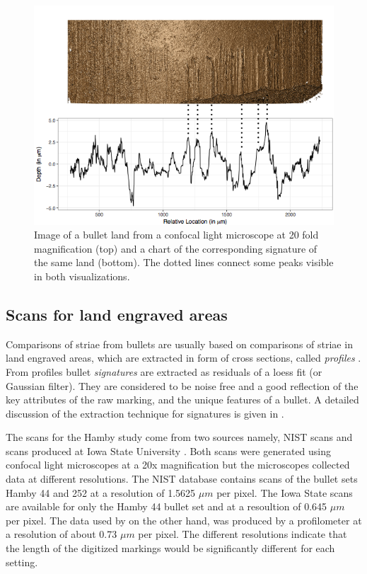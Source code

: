 \documentclass[12pt]{article}
\begin{document}
\begin{figure}
\centering
\includegraphics[width=\textwidth]{images/B6-B2-L6-rescaled.png}


\caption{\label{fig:rgl} Image of a bullet land from a confocal light microscope at 20 fold magnification (top) and a chart of the corresponding signature of the same land (bottom). The dotted lines connect some peaks visible in both visualizations.}

\end{figure}

\subsection{Scans for land engraved
areas}\label{scans-for-land-engraved-areas}

Comparisons of striae from bullets are usually based on comparisons of
striae in land engraved areas, which are extracted in form of cross
sections, called \emph{profiles} \citep{aoas,ma2004}. From profiles
bullet \emph{signatures} \citep{chu2013,aoas} are extracted as residuals
of a loess fit (or Gaussian filter). They are considered to be noise
free and a good reflection of the key attributes of the raw marking, and
the unique features of a bullet.
 A detailed
discussion of the extraction technique for signatures is given in
\citet{aoas}.

The scans for the Hamby study come from two sources namely, NIST scans
\citep{nist} and scans produced at Iowa State University
.
Both scans were generated using confocal light microscopes at a 20x
magnification but the microscopes collected data at different
resolutions. The NIST database contains scans of the bullet sets Hamby
44 and 252 at a resolution of 1.5625 \(\mu m\) per pixel. The Iowa State
scans are available for only the Hamby 44 bullet set and at a resoultion
of 0.645 \(\mu m\) per pixel. The data used by \citet{chumbley, hadler}
on the other hand, was produced by a profilometer at a resolution of
about 0.73 \(\mu m\) per pixel. The different resolutions indicate that
the length of the digitized markings would be significantly different
for each setting.
\end{document}

